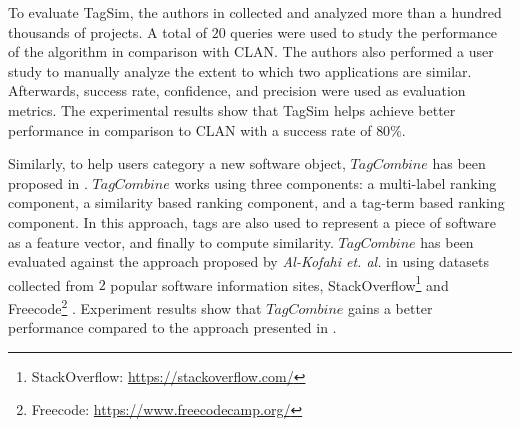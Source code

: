 To evaluate TagSim, the authors in \cite{Lo:2012:DSA:2473496.2473616} collected and analyzed more than a hundred thousands of projects. A total of $20$ queries were used to study the performance of the algorithm in comparison with CLAN. The authors also performed a user study to manually analyze the extent to which two applications are similar. Afterwards, success rate, confidence, and precision were used as evaluation metrics. The experimental results show that TagSim helps achieve better performance in comparison to CLAN with a success rate of $80\%$.

Similarly, to help users category a new software object, $TagCombine$ has been proposed in \cite{xia:tag:2013}. $TagCombine$ works using three components: a multi-label ranking component, a similarity based ranking component, and a tag-term based ranking component. In this approach, tags are also used to represent a piece of software as a feature vector, and finally to compute similarity. $TagCombine$ has been evaluated against the approach proposed by \emph{Al-Kofahi et. al.} in \cite{Al-Kofahi:2010:FSA:1912607.1913281} using datasets collected from $2$ popular software information sites, StackOverflow\footnote{StackOverflow: \url{https://stackoverflow.com/}} and Freecode\footnote{Freecode: \url{https://www.freecodecamp.org/}} \cite{xia:tag:2013}. Experiment results show that $TagCombine$ gains a better performance compared to the approach presented in \cite{Al-Kofahi:2010:FSA:1912607.1913281}. 







%

